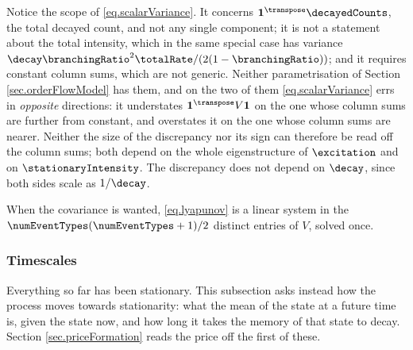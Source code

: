 \begin{remark}\label{remark.scalarVariance}
 Notice the scope of \eqref{eq.scalarVariance}.
 It concerns $\mathbf{1}^{\transpose}\decayedCounts$, the total decayed count,
 and not any single component;
 it is not a statement about the total intensity,
 which in the same special case has variance
 $\decay\branchingRatio^{2}\totalRate/(2(1-\branchingRatio))$;
 and it requires constant column sums, which are not generic.
 Neither parametrisation of Section \ref{sec.orderFlowModel} has them,
 and on the two of them \eqref{eq.scalarVariance} errs in \emph{opposite} directions:
 it understates $\mathbf{1}^{\transpose}V\mathbf{1}$ on the one whose column sums are
 further from constant, and overstates it on the one whose column sums are nearer.
 Neither the size of the discrepancy nor its sign can therefore be read off the column
 sums; both depend on the whole eigenstructure of $\excitation$ and on
 $\stationaryIntensity$.
 The discrepancy does not depend on $\decay$, since both sides scale as $1/\decay$.
\end{remark}

When the covariance is wanted, \eqref{eq.lyapunov} is a linear system in the
$\numEventTypes(\numEventTypes+1)/2$ distinct entries of $V$,
solved once.

\subsubsection{Timescales}

Everything so far has been stationary.
This subsection asks instead how the process moves towards stationarity:
what the mean of the state at a future time is, given the state now,
and how long it takes the memory of that state to decay.
Section \ref{sec.priceFormation} reads the price off the first of these.

